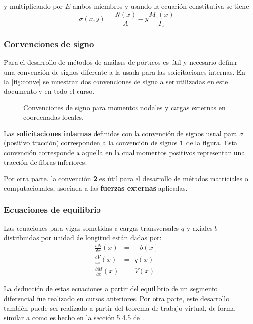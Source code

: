 y multiplicando por $E$ ambos miembros y usando la ecuación constitutiva se tiene
%
\begin{equation}
\boxed{
\sigma(x,y) = \frac{	N (x) }{A}
- y \frac{	M_z (x) }{I_z} 
}
\end{equation}


\subsubsection{Convenciones de signo}

Para el desarrollo de métodos de análisis de pórticos es útil y necesario definir una convención de signos diferente a la usada para las solicitaciones internas. %
%
En la \autoref{fig:conve} se muestran dos convenciones de signo a ser utilizadas en este documento y en todo el curso.
%
\begin{figure}[htb]
  \centering
  \def\svgwidth{0.8\textwidth}
  
	\caption{Convenciones de signo para momentos nodales y cargas externas en coordenadas locales.}
	\label{fig:conve}
\end{figure}

Las \textbf{solicitaciones internas} definidas con la convención de signos usual para $\sigma$ (positivo tracción) corresponden a la convención de signos \textbf{1} de la figura. %
%
Esta convención corresponde a aquella en la cual momentos positivos representan una tracción de fibras inferiores.

Por otra parte, la convención \textbf{2} es útil para el desarrollo de métodos matriciales o computacionales, asociada a las \textbf{fuerzas externas} aplicadas.

\subsubsection{Ecuaciones de equilibrio}

Las ecuaciones para vigas sometidas a cargas transversales $q$ y axiales $b$ distribuidas por unidad de longitud están dadas por:
%
\begin{eqnarray}
\frac{dN}{dx}(x) & =& -b(x) \\
\frac{dV}{dx}(x) & =& q(x) \label{eqn:eqcortante}\\
\frac{\partial M}{\partial x}(x) & =& V(x)
\end{eqnarray}
%

La deducción de estas ecuaciones a partir del equilibrio de un segmento diferencial fue realizado en cursos anteriores. %
Por otra parte, este desarrollo también puede ser realizado a partir del teorema de trabajo virtual, de forma similar a como es hecho en la sección 5.4.5 de \citep{Hughes1987a}.


